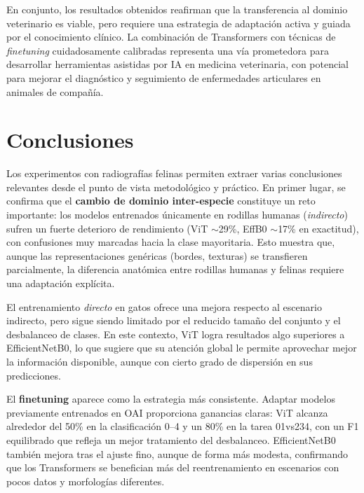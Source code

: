 \documentclass[11pt,spanish,listoffigures,listoftables]{tfgetsinf}
\begin{document}
En conjunto, los resultados obtenidos reafirman que la transferencia al dominio veterinario es viable, pero requiere una estrategia de adaptación activa y guiada por el conocimiento clínico. La combinación de Transformers con técnicas de \emph{finetuning} cuidadosamente calibradas representa una vía prometedora para desarrollar herramientas asistidas por IA en medicina veterinaria, con potencial para mejorar el diagnóstico y seguimiento de enfermedades articulares en animales de compañía.
\chapter{Conclusiones}

Los experimentos con radiografías felinas permiten extraer varias conclusiones relevantes desde el punto de vista metodológico y práctico. En primer lugar, se confirma que el \textbf{cambio de dominio inter-especie} constituye un reto importante: los modelos entrenados únicamente en rodillas humanas (\emph{indirecto}) sufren un fuerte deterioro de rendimiento (ViT $\sim$29\%, EffB0 $\sim$17\% en exactitud), con confusiones muy marcadas hacia la clase mayoritaria. Esto muestra que, aunque las representaciones genéricas (bordes, texturas) se transfieren parcialmente, la diferencia anatómica entre rodillas humanas y felinas requiere una adaptación explícita.

El entrenamiento \emph{directo} en gatos ofrece una mejora respecto al escenario indirecto, pero sigue siendo limitado por el reducido tamaño del conjunto y el desbalanceo de clases. En este contexto, ViT logra resultados algo superiores a EfficientNetB0, lo que sugiere que su atención global le permite aprovechar mejor la información disponible, aunque con cierto grado de dispersión en sus predicciones.

El \textbf{finetuning} aparece como la estrategia más consistente. Adaptar modelos previamente entrenados en OAI proporciona ganancias claras: ViT alcanza alrededor del 50\% en la clasificación 0--4 y un 80\% en la tarea 01vs234, con un F1 equilibrado que refleja un mejor tratamiento del desbalanceo. EfficientNetB0 también mejora tras el ajuste fino, aunque de forma más modesta, confirmando que los Transformers se benefician más del reentrenamiento en escenarios con pocos datos y morfologías diferentes.
\end{document}
